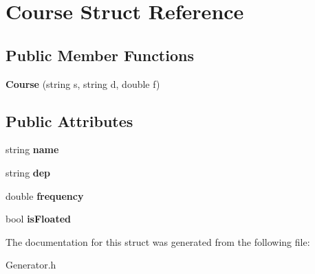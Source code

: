 \hypertarget{struct_course}{\section{Course Struct Reference}
\label{struct_course}
}
\subsection*{Public Member Functions}
\begin{DoxyCompactItemize}
\item 
\hypertarget{struct_course_ae57dff80bf3c852e52c0d05ba14ac03d}{{\bfseries Course} (string s, string d, double f)}\label{struct_course_ae57dff80bf3c852e52c0d05ba14ac03d}

\end{DoxyCompactItemize}
\subsection*{Public Attributes}
\begin{DoxyCompactItemize}
\item 
\hypertarget{struct_course_acb352d670b8d61c75119ad86c68cb950}{string {\bfseries name}}\label{struct_course_acb352d670b8d61c75119ad86c68cb950}

\item 
\hypertarget{struct_course_a50f465bdf90eacab34209f8f857d3228}{string {\bfseries dep}}\label{struct_course_a50f465bdf90eacab34209f8f857d3228}

\item 
\hypertarget{struct_course_ac20750c9b241ddd5b8a29e7f7368f5b5}{double {\bfseries frequency}}\label{struct_course_ac20750c9b241ddd5b8a29e7f7368f5b5}

\item 
\hypertarget{struct_course_a661df794d286ec3096b7d4267f340788}{bool {\bfseries is\-Floated}}\label{struct_course_a661df794d286ec3096b7d4267f340788}

\end{DoxyCompactItemize}


The documentation for this struct was generated from the following file\-:\begin{DoxyCompactItemize}
\item 
Generator.\-h\end{DoxyCompactItemize}
